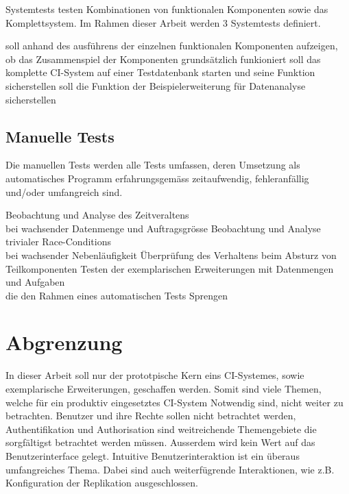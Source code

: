 Systemtests testen Kombinationen von funktionalen Komponenten sowie das Komplettsystem.
Im Rahmen dieser Arbeit werden 3 Systemtests definiert.


\begin{description}
  \dhitem[Komponentendurchlauf]
    soll anhand des ausf\"uhrens der einzelnen funktionalen Komponenten
    aufzeigen, ob das Zusammenspiel der Komponenten
    grunds\"atzlich funkioniert
  \dhitem[Komplettstystem]
    soll das komplette CI-System auf einer Testdatenbank starten
    und seine Funktion sicherstellen
    soll die Funktion der Beispielerweiterung f\"ur Datenanalyse sicherstellen
\end{description}

\subsection{Manuelle Tests}

Die manuellen Tests werden alle Tests umfassen,
deren Umsetzung als automatisches Programm erfahrungsgem\"ass zeitaufwendig,
fehleranf\"allig und/oder umfangreich sind.


\begin{description}
    Beobachtung und Analyse des Zeitveraltens \\
    bei wachsender Datenmenge und Auftragsgr\"osse
    Beobachtung und Analyse trivialer Race-Conditions \\
    bei wachsender Nebenl\"aufigkeit
    \"Uberpr\"ufung des Verhaltens beim Absturz von Teilkomponenten
    Testen der exemplarischen Erweiterungen mit Datenmengen und Aufgaben \\
    die den Rahmen eines automatischen Tests Sprengen
\end{description}


\section{Abgrenzung}

In dieser Arbeit soll nur der prototpische Kern eins CI-Systemes,
sowie exemplarische Erweiterungen, geschaffen werden.
Somit sind viele Themen, welche f\"ur ein produktiv eingesetztes CI-System Notwendig
sind, nicht weiter zu betrachten.
Benutzer und ihre Rechte sollen nicht betrachtet werden,
Authentifikation und Authorisation sind weitreichende Themengebiete die sorgf\"altigst betrachtet werden m\"ussen.
Ausserdem wird kein Wert auf das Benutzerinterface gelegt.
Intuitive Benutzerinteraktion ist ein \"uberaus umfangreiches Thema.
Dabei sind auch weiterf\"ugrende Interaktionen, wie z.B. Konfiguration der Replikation ausgeschlossen.


